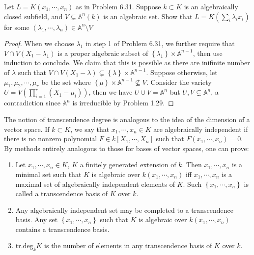 \documentclass{solution}
\begin{document}
\begin{problem}{6.32}
    Let $L = K(x_1, \cdots, x_n)$ as in Problem 6.31. Suppose $k \subset K$ is an algebraically closed subfield, and $V \subsetneq \mathbb{A}^n(k)$ is an algebraic set. Show that $L = K(\sum\limits_{i} \lambda_i x_i)$ for some $(\lambda_1, \cdots, \lambda_n) \in \mathbb{A}^n \setminus V$
\end{problem}

\begin{proof}
    When we choose $\lambda_1$ in step 1 of Problem 6.31, we further require that $V \cap V(X_1 - \lambda_1)$ is a proper algebraic subset of $\left\lbrace \lambda_1 \right\rbrace \times \mathbb{A}^{n - 1}$, then use induction to conclude. We claim that this is possible as there are inifinite number of $\lambda$ such that $V \cap V(X_1 - \lambda) \subsetneq \left\lbrace \lambda \right\rbrace \times \mathbb{A}^{n - 1}$. Suppose otherwise, let $\mu_1, \mu_2, \cdots, \mu_r$ be the set where $\left\lbrace \mu \right\rbrace \times \mathbb{A}^{n - 1} \nsubseteq V$. Consider the variety $U = V(\prod\limits_{i = 1}^{r} (X_1 - \mu_i))$, then we have $U \cup V = \mathbb{A}^{n}$ but $U, V \subsetneq \mathbb{A}^{n}$, a contradiction since $\mathbb{A}^n$ is irreducible by Problem 1.29.
\end{proof}

\begin{problem}{6.33}
    The notion of transcendence degree is analogous to the idea of the dimension of a vector space. If $k \subset K$, we say that $x_1, \cdots, x_n \in K$ are algebraically independent if there is no nonzero polynomial $F \in k[X_1, \cdots, X_n]$ such that $F(x_1, \cdots, x_n) = 0$. By methods entirely analogous to those for bases of vector spaces, one can prove:
    \begin{enumerate}
        \item Let $x_1, \cdots, x_n \in K$, $K$ a finitely generated extension of $k$. Then $x_1, \cdots, x_n$ is a minimal set such that $K$ is algebraic over $k(x_1, \cdots, x_n)$ iff $x_1, \cdots, x_n$ is a maximal set of algebraically independent elements of $K$. Such $\left\lbrace x_1, \cdots, x_n \right\rbrace$ is called a transcendence basis of $K$ over $k$.
        \item Any algebraically independent set may be completed to a transcendence basis. Any set $\left\lbrace x_1, \cdots, x_n \right\rbrace$ such that $K$ is algebraic over $k(x_1, \cdots, x_n)$ contains a transcendence basis.
        \item $\textrm{tr.deg}_k K$ is the number of elements in any transcendence basis of $K$ over $k$.
    \end{enumerate}
\end{problem}
\end{document}
